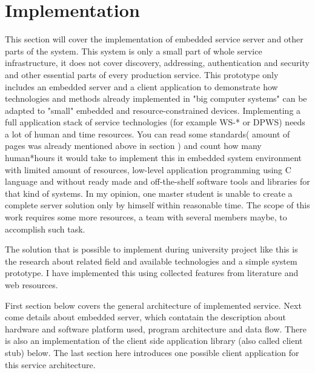 \section{Implementation}
\label{sec:implementation}
This section will cover the implementation of embedded service server and other
parts of the system. This system is only a small part of whole service
infrastructure, it does not cover discovery, addressing, authentication and
security and other essential parts of every production service.
This prototype only includes an embedded server and a client application to
demonstrate how technologies and methods already implemented in "big computer
systems" can be adapted to "small" embedded and resource-constrained devices.
Implementing a full application stack of service technologies (for example WS-*
or \gls{DPWS}) needs a lot of human and time resources. You can read
some standards( amount of pages was already mentioned above in section
) and count how many
human*hours it would take to implement this in embedded system environment with limited amount of resources, low-level
application programming using C language and without ready made and
off-the-shelf software tools and libraries for that kind of systems. In my opinion, one master student
is unable to create a complete server solution only by himself within reasonable
time. The scope of this work requires some more resources, a team with several
members maybe, to accomplish such task.

The solution that is possible to implement during university project like this
is the research about related field and available technologies and a simple
system prototype.
I have implemented this using collected features from literature and web
resources.

First section below covers the general architecture of implemented service.
Next come details about embedded server, which contatain the description about
hardware and software platform used, program architecture and data flow.
There is also an implementation of the client side application library (also
called client stub) below.
The last section here introduces one possible client application for
this service architecture.






